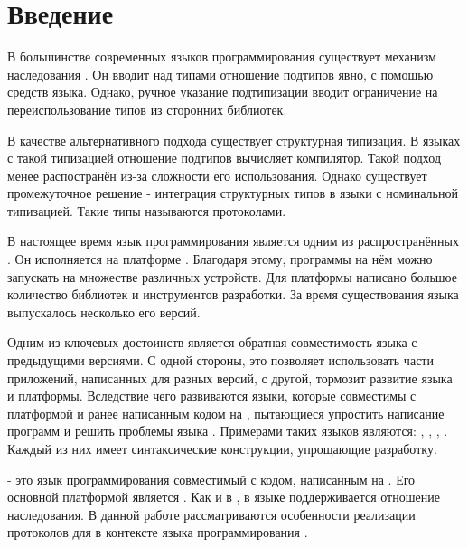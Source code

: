\section*{Введение}

В большинстве современных языков программирования существует механизм наследования \cite{Cook:1989:IS:96709.96721}. Он вводит над типами отношение подтипов явно, с помощью средств языка. Однако, ручное указание подтипизации вводит ограничение на переиспользование типов из сторонних библиотек.

В качестве альтернативного подхода существует структурная типизация\cite{book:pierce}. В языках с такой типизацией отношение подтипов вычисляет компилятор. Такой подход менее распостранён из-за сложности его использования. Однако существует промежуточное решение - интеграция структурных типов в языки с номинальной типизацией. Такие типы называются протоколами.

В настоящее время язык программирования  является одним из распространённых \cite{tiobe}. Он исполняется на платформе   . Благодаря этому, программы на нём можно запускать на множестве различных устройств. Для платформы написано большое количество библиотек и инструментов разработки. За время существования языка выпускалось несколько его версий.

Одним из ключевых достоинств  является обратная совместимость языка с предыдущими версиями\cite{openjdk:compatibility}. С одной стороны, это позволяет использовать части приложений, написанных для разных версий, с другой, тормозит развитие языка и платформы. Вследствие чего развиваются языки, которые совместимы с платформой  и ранее написанным кодом на , пытающиеся упростить написание программ и решить проблемы языка . Примерами таких языков являются: , , , . Каждый из них имеет синтаксические конструкции, упрощающие разработку.

 - это язык программирования совместимый с кодом, написанным на . Его основной платформой является . Как и в , в языке  поддерживается отношение наследования. В данной работе рассматриваются особенности реализации протоколов для  в контексте языка программирования .
